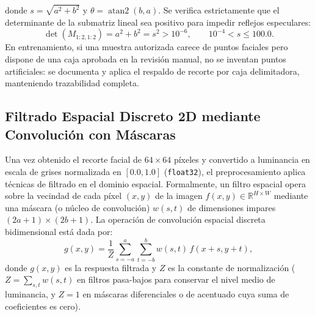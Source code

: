 \documentclass{article}
\begin{document}
donde $s = \sqrt{a^2 + b^2}$ y $\theta = \operatorname{atan2}(b, a)$. Se verifica estrictamente que el determinante de la submatriz lineal sea positivo para impedir reflejos especulares:
\begin{equation}
\det(M_{1:2,1:2}) = a^2 + b^2 = s^2 > 10^{-6}, \qquad 10^{-4} < s \le 100.0.
\label{eq:restriccion_determinante}
\end{equation}
En entrenamiento, si una muestra autorizada carece de puntos faciales pero dispone de una caja aprobada en la revisión manual, no se inventan puntos artificiales: se documenta y aplica el respaldo de recorte por caja delimitadora, manteniendo trazabilidad completa.

\subsection{Filtrado Espacial Discreto 2D mediante Convolución con Máscaras}
Una vez obtenido el recorte facial de $64 \times 64$ píxeles y convertido a luminancia en escala de grises normalizada en $[0.0, 1.0]$ (\texttt{float32}), el preprocesamiento aplica técnicas de filtrado en el dominio espacial. Formalmente, un filtro espacial opera sobre la vecindad de cada píxel $(x,y)$ de la imagen $f(x,y) \in \mathbb{R}^{H \times W}$ mediante una máscara (o núcleo de convolución) $w(s,t)$ de dimensiones impares $(2a+1) \times (2b+1)$. La operación de convolución espacial discreta bidimensional está dada por:
\begin{equation}
g(x, y) = \frac{1}{Z} \sum_{s=-a}^{a} \sum_{t=-b}^{b} w(s, t)\, f(x + s, y + t),
\label{eq:convolucion_espacial}
\end{equation}
donde $g(x,y)$ es la respuesta filtrada y $Z$ es la constante de normalización ($Z = \sum_{s,t} w(s,t)$ en filtros pasa-bajos para conservar el nivel medio de luminancia, y $Z = 1$ en máscaras diferenciales o de acentuado cuya suma de coeficientes es cero).
\end{document}
